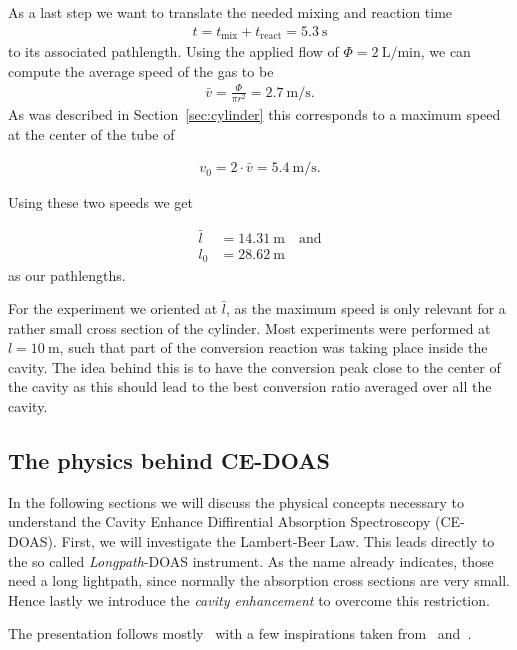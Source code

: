 As a last step we want to translate the needed mixing and reaction
time
\begin{align*}
  t = t_{\text{mix}} + t_{\text{react}} = \SI{5.3}{\second}
\end{align*}
to its associated pathlength. Using the applied flow
of $\Phi = \SI{2}{\liter\per\minute}$, we can compute the average
speed of the gas to be
\begin{align*}
  \bar v = \frac{\Phi}{\pi r^2} = \SI{2.7}{\meter\per\second}. 
\end{align*}
As was described in Section~\ref{sec:cylinder} this corresponds to a
maximum speed at the center of the tube of

\begin{align*}
  v_0 = 2\cdot \bar v = \SI{5.4}{\meter\per\second}.
\end{align*}

Using these two speeds we get

\begin{align*}
  \bar l & = \SI{14.31}{\meter} \quad \text{and}\\
  l_0 & = \SI{28.62}{\meter}
\end{align*}
as our pathlengths.

For the experiment we oriented at $\bar l$, as the maximum speed is
only relevant for a rather small cross section of the
cylinder. Most experiments were performed at $l = \SI{10}{\meter}$,
such that part of the conversion reaction was taking place inside the
cavity. The idea behind this is to have the conversion peak close to
the center of the cavity as this should lead to the best conversion
ratio averaged over all the cavity.

\subsection{The physics behind CE-DOAS}
\label{sec:ce-doas-physics}

In the following sections we will discuss the physical concepts
necessary to understand the Cavity Enhance Diffirential Absorption
Spectroscopy (CE-DOAS). First, we will investigate the Lambert-Beer
Law. This leads directly to the so called \emph{Longpath}-DOAS
instrument. As the name already indicates, those need a long
lightpath, since normally the absorption cross sections are very
small. Hence lastly we introduce the \emph{cavity enhancement} to
overcome this restriction.

The presentation follows mostly~\cite{fp58} with a few inspirations
taken from~\cite{bsc} and~\cite{platt}.

